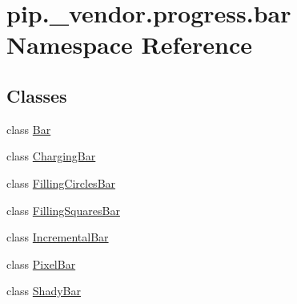 \hypertarget{namespacepip_1_1__vendor_1_1progress_1_1bar}{}\section{pip.\+\_\+vendor.\+progress.\+bar Namespace Reference}
\label{namespacepip_1_1__vendor_1_1progress_1_1bar}
\subsection*{Classes}
\begin{DoxyCompactItemize}
\item 
class \hyperlink{classpip_1_1__vendor_1_1progress_1_1bar_1_1Bar}{Bar}
\item 
class \hyperlink{classpip_1_1__vendor_1_1progress_1_1bar_1_1ChargingBar}{Charging\+Bar}
\item 
class \hyperlink{classpip_1_1__vendor_1_1progress_1_1bar_1_1FillingCirclesBar}{Filling\+Circles\+Bar}
\item 
class \hyperlink{classpip_1_1__vendor_1_1progress_1_1bar_1_1FillingSquaresBar}{Filling\+Squares\+Bar}
\item 
class \hyperlink{classpip_1_1__vendor_1_1progress_1_1bar_1_1IncrementalBar}{Incremental\+Bar}
\item 
class \hyperlink{classpip_1_1__vendor_1_1progress_1_1bar_1_1PixelBar}{Pixel\+Bar}
\item 
class \hyperlink{classpip_1_1__vendor_1_1progress_1_1bar_1_1ShadyBar}{Shady\+Bar}
\end{DoxyCompactItemize}

